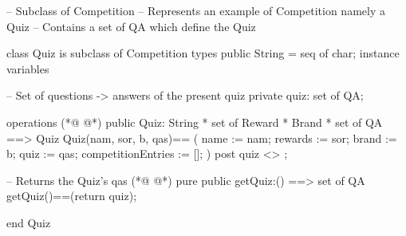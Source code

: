 \begin{vdmpp}[breaklines=true]
-- Subclass of Competition
-- Represents an example of Competition namely a Quiz
-- Contains a set of QA which define the Quiz

class Quiz is subclass of Competition
  types 
   public String = seq of char;   
  instance variables
  
   -- Set of questions -> answers of the present quiz
   private quiz: set of QA;
   
  
  operations
(*@
\label{Quiz:15}
@*)
   public Quiz: String * set of Reward * Brand * set of QA ==> Quiz
   Quiz(nam, sor, b, qas)== 
   (
     name := nam;
     rewards := sor;
     brand := b;
     quiz := qas;
     competitionEntries := [];
   )
   post quiz <> {};
   
   -- Returns the Quiz's qas
(*@
\label{getQuiz:27}
@*)
   pure public getQuiz:() ==> set of QA
    getQuiz()==(return quiz); 
    

end Quiz
\end{vdmpp}
